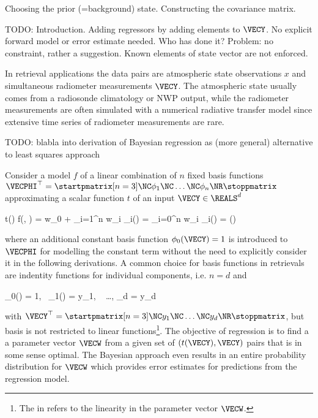     \startsubsection[title={Constructing the Prior},reference=ch:construct_prior]

        Choosing the prior (=background) state. Constructing the covariance
        matrix.

    \stopsubsection

\stopsection


\startsection[title=Linear Regression]

    TODO: Introduction. Adding regressors by adding elements to $\VECY$. No
    explicit forward model or error estimate needed.  Who has done it? Problem:
    no constraint, rather a suggestion. Known elements of state vector are not
    enforced.

    In retrieval applications the data pairs are atmospheric state observations
    $x$ and simultaneous radiometer measurements $\VECY$. The atmospheric state
    usually comes from a radiosonde climatology or NWP output, while the
    radiometer measurements are often simulated with a numerical radiative
    transfer model since extensive time series of radiometer measurements are
    rare.

    TODO: blabla into derivation of Bayesian regression as (more general)
    alternative to least squares approach

    Consider a model $f$ of a linear combination of $n$ fixed basis functions
    $\VECPHI^\top = \startpmatrix[n=3] \NC \phi_1 \NC \dots \NC \phi_n \NR
    \stoppmatrix$ approximating a scalar function $t$ of an input $\VECY \in
    \REALS^d$

    \startformula
        t(\VECY) \approx f(\VECY, \VECW) = w_0 + \sum_{i=1}^n w_i \phi_i(\VECY)
            = \sum_{i=0}^n w_i \phi_i(\VECY) = \VECWT \VECPHI(\VECY)
    \stopformula

    where an additional constant basis function $\phi_0(\VECY) = 1$ is
    introduced to $\VECPHI$ for modelling the constant term without the need to
    explicitly consider it in the following derivations. A common choice for
    basis functions in retrievals are indentity functions for individual
    components, i.e. $n = d$ and

    \startformula
        \phi_0(\VECY) = 1,~ \phi_1(\VECY) = y_1, ~ \dots, \phi_d = y_d
    \stopformula

    with $\VECY^\top = \startpmatrix[n=3] \NC y_1 \NC \dots \NC y_d \NR \stoppmatrix$,
    but basis is not restricted to linear functions\footnote{The 
    in  refers to the linearity in the parameter
    vector $\VECW$.}. The objective of regression is to find a
    a parameter vector $\VECW$ from a given set of $(t(\VECY), \VECY)$ pairs
    that is in some sense optimal. The Bayesian approach even results in
    an entire probability distribution for $\VECW$ which provides error
    estimates for predictions from the regression model.


